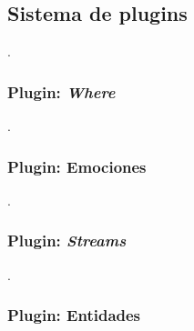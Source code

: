 \subsection{Sistema de plugins}
.

\subsubsection{Plugin: \textit{Where}}
.

\subsubsection{Plugin: Emociones}

.

\subsubsection{Plugin: \textit{Streams}}

.

\subsubsection{Plugin: Entidades}

